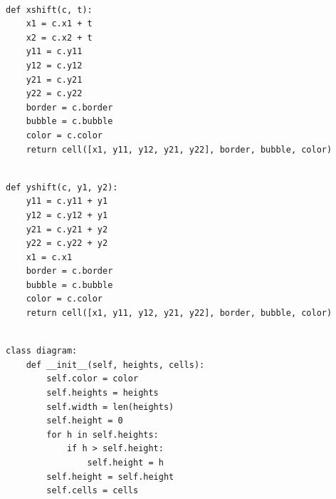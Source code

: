 \documentclass{book}
\newcounter{pcounter}
\begin{document}
\begin{center}
\begin{tcolorbox}[width=5in,colback={white},title={\begin{center}\texttt{Python \thepcounter} \addtocounter{pcounter}{1}  \end{center}},colbacktitle=Red,coltitle=black]
\begin{verbatim}

def xshift(c, t):
    x1 = c.x1 + t
    x2 = c.x2 + t
    y11 = c.y11
    y12 = c.y12
    y21 = c.y21
    y22 = c.y22
    border = c.border
    bubble = c.bubble
    color = c.color
    return cell([x1, y11, y12, y21, y22], border, bubble, color)

\end{verbatim}%
\end{tcolorbox}
\end{center}

\begin{center}
\begin{tcolorbox}[width=5in,colback={white},title={\begin{center}\texttt{Python \thepcounter} \addtocounter{pcounter}{1}  \end{center}},colbacktitle=Red,coltitle=black]
\begin{verbatim}

def yshift(c, y1, y2):
    y11 = c.y11 + y1
    y12 = c.y12 + y1
    y21 = c.y21 + y2
    y22 = c.y22 + y2
    x1 = c.x1
    border = c.border
    bubble = c.bubble
    color = c.color
    return cell([x1, y11, y12, y21, y22], border, bubble, color)

\end{verbatim}%
\end{tcolorbox}
\end{center}

\begin{center}
\begin{tcolorbox}[width=5in,colback={white},title={\begin{center}\texttt{Python \thepcounter} \addtocounter{pcounter}{1}  \end{center}},colbacktitle=Red,coltitle=black]
\begin{verbatim}

class diagram:
    def __init__(self, heights, cells):
        self.color = color
        self.heights = heights
        self.width = len(heights)
        self.height = 0
        for h in self.heights:
            if h > self.height:
                self.height = h
        self.height = self.height
        self.cells = cells

\end{verbatim}%
\end{tcolorbox}
\end{center}
\end{document}
